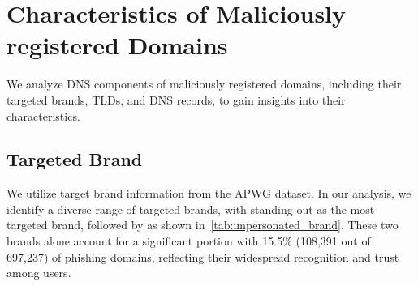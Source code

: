 \section{Characteristics of Maliciously registered Domains}
\label{sec:mal-reg-char}


% 




We analyze DNS components of maliciously registered domains, including their targeted brands, TLDs, and DNS records, to gain insights into their characteristics.

\subsection{Targeted Brand}
We utilize target brand information from the APWG dataset.
In our analysis, we identify a diverse range of targeted brands, with  standing out as the most targeted brand, followed by  as shown in~\autoref{tab:impersonated_brand}. 
These two brands alone account for a significant portion with 15.5\% (108,391 out of 697,237) of phishing domains, reflecting their widespread recognition and trust among users. 

